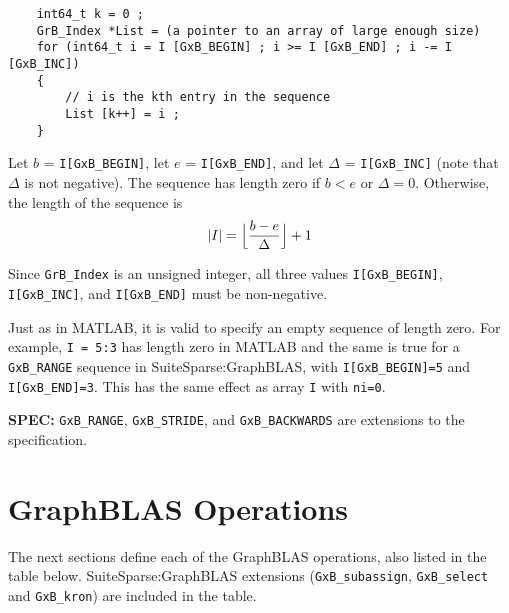 \documentclass[12pt]{article}
\begin{document}
\begin{enumerate}
    \vspace{-0.1in}
    {\footnotesize
    \begin{verbatim}
    int64_t k = 0 ;
    GrB_Index *List = (a pointer to an array of large enough size)
    for (int64_t i = I [GxB_BEGIN] ; i >= I [GxB_END] ; i -= I [GxB_INC])
    {
        // i is the kth entry in the sequence
        List [k++] = i ;
    } \end{verbatim}}

    \vspace{-0.1in}
    Let $b$ = \verb'I[GxB_BEGIN]', let $e$ = \verb'I[GxB_END]', and let
    $\Delta$ = \verb'I[GxB_INC]' (note that $\Delta$ is not negative).  The
    sequence has length zero if $b < e$ or $\Delta=0$.  Otherwise, the length
    of the sequence is
    \[
    |I| = \Bigl\lfloor\dfrac{b-e}{\Delta}\Bigr\rfloor + 1
    \]

\end{enumerate}

Since \verb'GrB_Index' is an unsigned integer, all three values
\verb'I[GxB_BEGIN]', \verb'I[GxB_INC]', and \verb'I[GxB_END]' must
be non-negative.

Just as in MATLAB, it is valid to specify an empty sequence of length zero.
For example, \verb'I = 5:3' has length zero in MATLAB and the same is
true for a \verb'GxB_RANGE' sequence in SuiteSparse:GraphBLAS, with
\verb'I[GxB_BEGIN]=5' and \verb'I[GxB_END]=3'.  This has the same
effect as array \verb'I' with \verb'ni=0'.

\begin{spec}
{\bf SPEC:} \verb'GxB_RANGE', \verb'GxB_STRIDE', and \verb'GxB_BACKWARDS'
are extensions to the specification.
\end{spec}

\newpage
\section{GraphBLAS Operations} %
\label{operations}

The next sections define each of the GraphBLAS operations, also listed in the
table below.  SuiteSparse:GraphBLAS extensions (\verb'GxB_subassign',
\verb'GxB_select' and \verb'GxB_kron') are included in the table.
\end{document}
